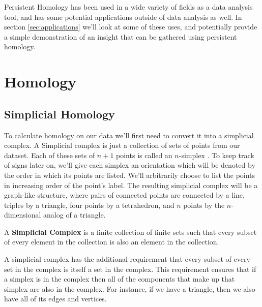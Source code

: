 Persistent Homology has been used in a wide variety of fields as a data analysis tool, and has some potential applications outside of data analysis as well.
In section \ref{sec:applications} we'll look at some of these uses, and potentially provide a simple demonstration of an insight that can be gathered using persistent homology.

\section{Homology}\label{sec:homology}

\subsection{Simplicial Homology}\label{sec:simplicial-homology}

To calculate homology on our data we'll first need to convert it into a simplicial complex.
A Simplicial complex is just a collection of sets of points from our dataset. Each of these sets of \(n+1\) points is called an \(n\)-simplex .
To keep track of signs later on, we'll give each simplex an orientation which will be denoted by the order in which its points are listed.
We'll arbitrarily choose to list the points in increasing order of the point's label.
The resulting simplicial complex will be a graph-like structure, where pairs of connected points are connected by a line, triples by a triangle, four points by a tetrahedron, and \(n\) points by the \(n\)-dimensional analog of a triangle.

\begin{definition}\label{def:simplicial-complex}
    A \textbf{Simplicial Complex} is a finite collection of finite sets such that every subset of every element in the collection is also an element in the collection. \cite{wagner}
\end{definition}

A simplicial complex has the additional requirement that every subset of every set in the complex is itself a set in the complex. This requirement ensures that if a simplex is in the complex then all of the components that make up that simplex are also in the complex. For instance, if we have a triangle, then we also have all of its edges and vertices.

\begin{figure}
    
    \caption{}
    \label{fig:basic-simplices}
\end{figure}

